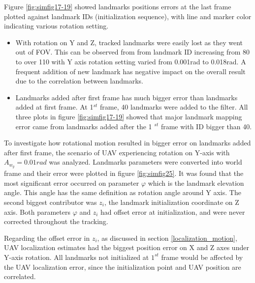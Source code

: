 Figure \ref{fig:simfig17-19} showed landmarks positions errors at
the last frame plotted against landmark IDs (initialization
sequence), with line and marker color indicating various rotation setting.

\begin{itemize}
  \item With rotation on Y and Z, tracked landmarks were easily lost
  as they went out of FOV. This can be observed from from landmark ID
  increasing from 80 to over 110 with Y axis rotation setting varied
  from 0.001rad to 0.018rad. A frequent addition of new landmark
  has negative impact on the overall result due to the correlation
  between landmarks. 
  \item Landmarks added after first frame has much bigger error than
  landmarks added at first frame. At 1$^{st}$ frame, 40 landmarks were
  added to the filter. All three plots in figure \ref{fig:simfig17-19}
  showed that major landmark mapping error came from landmarks added
  after the 1 $^{st}$ frame with ID bigger than 40.
\end{itemize}
\FloatBarrier

To investigate how rotational motion resulted in bigger error on
landmarks added after first frame, the scenario of UAV experiencing
rotation on Y-axis with $A_{w_y}=0.01rad$ was analyzed. Landmarks
parameters were converted into world frame and their error were
plotted in figure \ref{fig:simfig25}. It was found that the most
significant error occurred on parameter $\varphi$ which is the landmark
elevation angle. This angle has the same definition as rotation angle
around Y axis. The second biggest contributor was $z_i$, the landmark
initialization coordinate on Z axis. Both parameters $\varphi$ and
$z_i$ had offset error at initialization, and were never corrected
throughout the tracking.

Regarding the offset error in $z_i$, as discussed in section
\ref{localization_motion}, UAV localization estimates had the biggest
position error on X and Z axes under Y-axis rotation. All landmarks
not initialized at $1^{st}$ frame would be affected by the UAV
localization error, since the initialization point and UAV position
are correlated.


